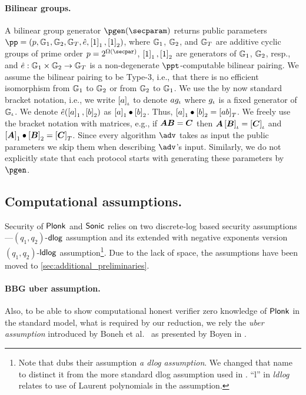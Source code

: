 \let\accentvec\vec \documentclass[runningheads]{llncs}
\def\vec#1{\mathchoice{\mbox{\boldmath$\displaystyle#1$}}
{\mbox{\boldmath$\textstyle#1$}} {\mbox{\boldmath$\scriptstyle#1$}}
{\mbox{\boldmath$\scriptscriptstyle#1$}}}
\begin{document}
\paragraph{Bilinear groups.}
A bilinear group generator $\pgen (\secparam)$ returns public parameters $ \pp =
(p, \GRP_1, \GRP_2, \GRP_T, \pair, \gone{1}, \gtwo{1})$, where $\mathbb{G}_1$,
$\mathbb{G}_2$, and $\mathbb{G}_T$ are additive cyclic groups of prime order $p = 2^{\Omega
  (\secpar)}$, $\left[1\right]_{1}, \left[1\right]_{2}$ are generators of $\mathbb{G}_1$, $\mathbb{G}_2$, resp.,
and $\hat{e}: \mathbb{G}_1 \times \mathbb{G}_2 \to \mathbb{G}_T$ is a non-degenerate
$\ppt$-computable bilinear pairing. We assume the bilinear pairing to be Type-3,
i.e., that there is no efficient isomorphism from $\mathbb{G}_1$ to $\mathbb{G}_2$ or from
$\mathbb{G}_2$ to $\mathbb{G}_1$. We use the by now standard bracket notation, i.e., we
write $\left[a\right]_{\iota}$ to denote $a g_{\iota}$ where $g_{\iota}$ is a fixed generator
of $\mathbb{G}_{\iota}$. We denote $\hat{e} (\left[a\right]_{1}, \left[b\right]_{2})$ as $\left[a\right]_{1} \bullet
\left[b\right]_{2}$. Thus, $\left[a\right]_{1} \bullet \left[b\right]_{2} = \left[a b\right]_{T}$. We freely use the
bracket notation with matrices, e.g., if $\vec{A} \vec{B} = \vec{C}$ then
$\vec{A} \grpgi{\vec{B}} = \grpgi{\vec{C}}$ and $\gone{\vec{A}}\bullet
\gtwo{\vec{B}} = \gtar{\vec{C}}$. Since every algorithm $\adv$ takes as input
the public parameters we skip them when describing $\adv$'s input. Similarly, we
do not explicitly state that each protocol starts with generating these
parameters by $\pgen$.

\subsection{Computational assumptions.}
Security of $\textnormal{\textsf{Plonk}}$ and ${\textnormal{\textsf{Sonic}}}$ relies on two discrete-log based security
assumptions---$(q_1, q_2)$-$\mathsf{dlog}$ assumption and its extended with negative
exponents version $(q_1, q_2)$-$\mathsf{ldlog}$ assumption\footnote{Note that
  \cite{CCS:MBKM19} dubs their assumption \emph{a dlog assumption}. We changed
  that name to distinct it from the more standard dlog assumption used in
  \cite{EPRINT:GabWilCio19}. ``l'' in \emph{ldlog} relates to use of Laurent
  polynomials in the assumption.}. Due to the lack of space, the assumptions
have been moved to \cref{sec:additional_preliminaries}.

\paragraph{BBG uber assumption.}
Also, to be able to show computational honest verifier zero knowledge of
$\textnormal{\textsf{Plonk}}$ in the standard model, what is required by our reduction, we rely the
\emph{uber assumption} introduced by Boneh et
al.~\cite{EC:BonBoyGoh05} as presented by Boyen in \cite{PAIRING:Boyen08}.
\end{document}
